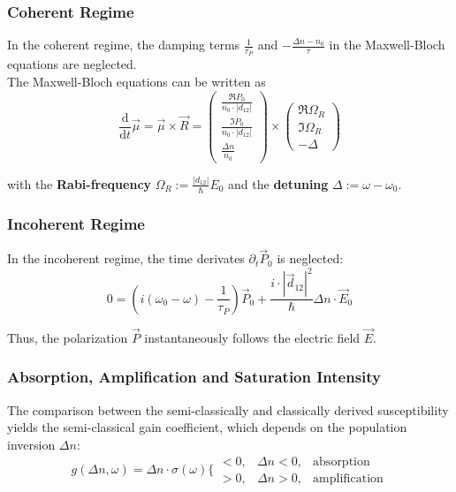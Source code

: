 \documentclass{article}
\newcommand{\diff}{\mathrm{d}}
\newcommand{\lr}[1]{\left(#1\right)}
\begin{document}
\newpage


\subsubsection*{Coherent Regime}
In the coherent regime, the damping terms $\frac{1}{\tau_P}$ and $-\frac{\Delta n - n_0}{\tau}$ in the Maxwell-Bloch equations are neglected.\\
The Maxwell-Bloch equations can be written as
	\begin{equation}
		\frac{\diff}{\diff t}\vec{\mu} = \vec{\mu} \times \vec{R} = 
		\begin{pmatrix}
			\frac{\Re P_0}{n_0 \cdot |d_{12}|} \\
			\frac{\Im P_0}{n_0 \cdot |d_{12}|} \\
			\frac{\Delta n}{n_0}
		\end{pmatrix}
		\times
		\begin{pmatrix}
			\Re \Omega_R \\
			\Im \Omega_R \\
			-\Delta
		\end{pmatrix}
	\end{equation}

with the \textbf{Rabi-frequency} $\Omega_R := \frac{|d_{12}|}{\hbar}E_0$ and the \textbf{detuning} $\Delta := \omega - \omega_0$.


\subsubsection*{Incoherent Regime}
In the incoherent regime, the time derivates $\partial_t \vec{P}_0$ is neglected:
	\begin{equation}
		0 = \lr{ i(\omega_0 - \omega) - \frac{1}{\tau_P} } \vec{P}_0 + \frac{i\cdot|\vec{d}_{12}|^2}{\hbar} \Delta n \cdot \vec{E}_0
	\end{equation}

Thus, the polarization $\vec{P}$ instantaneously follows the electric field $\vec{E}$.


\subsubsection{Absorption, Amplification and Saturation Intensity}
The comparison between the semi-classically and classically derived susceptibility yields the semi-classical gain coefficient, which depends on the population inversion $\Delta n$:
	\begin{equation}
		g(\Delta n,\omega) = \Delta n \cdot \sigma(\omega)
		\Bigg\{
			\begin{matrix}
				<0, & \Delta n<0, & \text{absorption} \\
				>0, & \Delta n>0, & \text{amplification} 
			\end{matrix}
	\end{equation}
\end{document}
